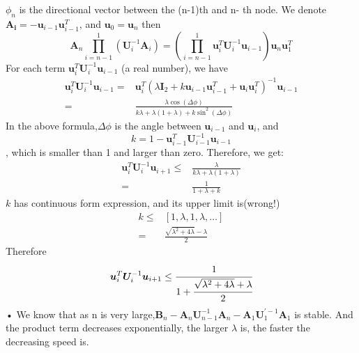 \documentclass[12pt]{article}
\begin{document}
$\phi_n$ is the directional vector between the (n-1)th and n- th node.
We denote $\bm{A_i}=-\bm{u}_{i-1}\bm{u}_{i-1}^T$, and $\bm{u}_0=\bm{u}_n$ then
\begin{equation}
\bm{A}_n \prod_{i=n-1}^1 (\bm{U}_i^{-1}\bm{A}_i)=\left(\prod_{i=n-1}^{1} \bm{u}_{i}^T\bm{U}_i^{-1}\bm{u}_{i-1}\right)\bm{u}_n\bm{u}_1^T
\end{equation}
For each term $\bm{u}_i^T\bm{U}_i^{-1}\bm{u}_{i-1}$ (a real number), we have
\begin{align}
\bm{u}_i^T\bm{U}_i^{-1}\bm{u}_{i-1}=&\bm{u}_i^T(\lambda\bm{I}_2+k\bm{u}_{i-1}\bm{u}_{i-1}^T+\bm{u}_{i}\bm{u}_{i}^T)^{-1}\bm{u}_{i-1}\\
=&\frac{\lambda\cos(\Delta\phi)}{k \lambda+\lambda(1+\lambda)+k\sin^2(\Delta\phi)}
\end{align}
In the above formula,$\Delta\phi$ is the angle between $\bm{u}_{i-1}$ and $\bm{u}_{i}$, and
\[
k=1-\bm{u}_{i-1}^T\bm{U}_{i-1}^{-1}\bm{u}_{i-1}
\],
which is smaller than 1 and larger than zero.
Therefore, we get:
\begin{align}
\bm{u}_i^T\bm{U}_i^{-1}\bm{u}_{i+1}\leq&
\frac{\lambda}{k \lambda+\lambda(1+\lambda)}\\
=&\frac{1}{1+\lambda+k}
\end{align}
$k$ has continuous form expression, and its upper limit is(wrong!)
\begin{align}
k\leq & [1,\lambda,1,\lambda,\dots]\\
=&\frac{\sqrt{\lambda^2+4\lambda}-\lambda}{2}
\end{align}
Therefore
\begin{equation}
\bm{u}_i^T\bm{U}_i^{-1}\bm{u}_{i+1}\leq\cfrac{1}{1+\cfrac{\sqrt{\lambda^2+4\lambda}+\lambda}{2}}
\end{equation}•
We know that as n is very large,$\bm{B}_n-\bm{A}_n\bm{U}^{-1}_{n-1}\bm{A}_n-\bm{A}_1\bm{U}_1^{\bm{'}-1}\bm{A}_1$ is stable. 
And the product term decreases exponentially, the larger $\lambda$ is, the faster the decreasing speed is.
\end{document}
